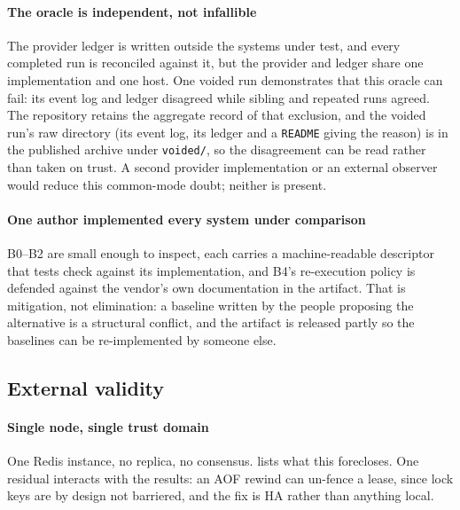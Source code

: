 \paragraph{The oracle is independent, not infallible} The provider ledger is
written outside the systems under test, and every completed run is reconciled
against it, but the provider and ledger share one implementation and one host.
One voided run demonstrates that this oracle can fail: its event log and ledger
disagreed while sibling and repeated runs agreed. The repository retains the
aggregate record of that exclusion, and the voided run's raw directory (its
event log, its ledger and a \texttt{README} giving the reason) is in the
published archive under \texttt{voided/}, so the disagreement can be read
rather than taken on trust. A second provider
implementation or an external observer would reduce this common-mode doubt;
neither is present.

\paragraph{One author implemented every system under comparison} B0--B2 are
small enough to inspect, each carries a machine-readable descriptor that tests
check against its implementation, and B4's re-execution policy is defended
against the vendor's own documentation in the artifact. That is mitigation, not
elimination: a baseline written by the people proposing the alternative is a
structural conflict, and the artifact is released partly so the baselines can be
re-implemented by someone else.

\subsection{External validity}

\paragraph{Single node, single trust domain} One Redis instance, no replica, no
consensus.  lists what this forecloses. One residual
interacts with the results: an AOF rewind can un-fence a lease, since lock keys
are by design not barriered, and the fix is HA rather than anything local.

